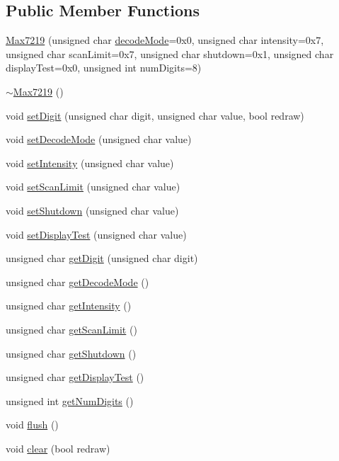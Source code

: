 \subsection*{Public Member Functions}
\begin{DoxyCompactItemize}
\item 
\hyperlink{classdrumpi_1_1Max7219_abc709f2a3b36fb872c560398b980aeb6}{Max7219} (unsigned char \hyperlink{classdrumpi_1_1Max7219_a7ba5a789cdd1120814595b89ba4e99e0}{decode\+Mode}=0x0, unsigned char intensity=0x7, unsigned char scan\+Limit=0x7, unsigned char shutdown=0x1, unsigned char display\+Test=0x0, unsigned int num\+Digits=8)
\item 
\hyperlink{classdrumpi_1_1Max7219_a47402da87a159c0fbe04b3a9cb5668f1}{$\sim$\+Max7219} ()
\item 
void \hyperlink{classdrumpi_1_1Max7219_ad85d8d612e1c7a817da7d18bd9f336da}{set\+Digit} (unsigned char digit, unsigned char value, bool redraw)
\item 
void \hyperlink{classdrumpi_1_1Max7219_a237f07a9f87919651cc30cb5afacbc7d}{set\+Decode\+Mode} (unsigned char value)
\item 
void \hyperlink{classdrumpi_1_1Max7219_a7a722668b9b1d232792f6877171ca7c5}{set\+Intensity} (unsigned char value)
\item 
void \hyperlink{classdrumpi_1_1Max7219_a2d13fd1c5a05004cb69dbaef8f1fed3a}{set\+Scan\+Limit} (unsigned char value)
\item 
void \hyperlink{classdrumpi_1_1Max7219_a7b4ded1ec0a564ef12fb1ed4fd45bd1c}{set\+Shutdown} (unsigned char value)
\item 
void \hyperlink{classdrumpi_1_1Max7219_a1f1e7b7c538c539854ad5901e6bba3fe}{set\+Display\+Test} (unsigned char value)
\item 
unsigned char \hyperlink{classdrumpi_1_1Max7219_a30e98c660745c63d883696589b0e4f4f}{get\+Digit} (unsigned char digit)
\item 
unsigned char \hyperlink{classdrumpi_1_1Max7219_a78fc1bac71f62e85657a224f23af2189}{get\+Decode\+Mode} ()
\item 
unsigned char \hyperlink{classdrumpi_1_1Max7219_a16035185e3439775135256e40ad638a9}{get\+Intensity} ()
\item 
unsigned char \hyperlink{classdrumpi_1_1Max7219_a3ec0ff91fa65b1d6a1c435b15cb4604e}{get\+Scan\+Limit} ()
\item 
unsigned char \hyperlink{classdrumpi_1_1Max7219_af2a8322c6ac792793fd9b2c6d7f389fd}{get\+Shutdown} ()
\item 
unsigned char \hyperlink{classdrumpi_1_1Max7219_aec71032f6aff755a3cf1a45183dceb96}{get\+Display\+Test} ()
\item 
unsigned int \hyperlink{classdrumpi_1_1Max7219_ab6bc447965dffdc63f050b2eda80cedd}{get\+Num\+Digits} ()
\item 
void \hyperlink{classdrumpi_1_1Max7219_a3b3f0f2a947caf27f65bd626f8e71f43}{flush} ()
\item 
void \hyperlink{classdrumpi_1_1Max7219_ac29e3df34f72833d995db8bc1810f04d}{clear} (bool redraw)
\end{DoxyCompactItemize}
